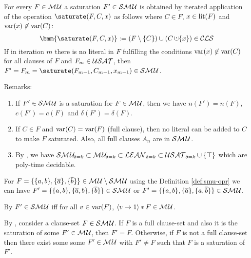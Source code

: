\documentclass{article}
\begin{document}
\begin{defi}\label{def:smu-opr}
\cite{KullmannZhao2012ConfluenceJ} For every $F \in \mathcal{M\hspace{0.8pt}U}$ a saturation $F' \in \mathcal{S}\mathcal{M\hspace{0.8pt}U}$ is obtained by iterated application of the operation $\saturate(F,C,x)$ as follows where $C \in F$, $x \in \operatorname{lit}(F)$ and $\operatorname{var}(x) \not \in \operatorname{var}(C)$:
  \begin{displaymath}
    \bmm{\saturate(F,C,x)} := (F \sm \set{C}) \cup (C \addcup \set{x}) \in \Cls
  \end{displaymath}
If in iteration $m$ there is no literal in $F$ fulfilling the conditions $\operatorname{var}(x) \not \in \operatorname{var}(C)$ for all clauses of $F$ and $F_m \in \mathcal{USAT}$, then $F' =F_m=\saturate(F_{m-1},C_{m-1},x_{m-1}) \in \Smusat$. 
\end{defi}
Remarks:
  \begin{enumerate}
  \item If $F' \in \mathcal{S}\mathcal{M\hspace{0.8pt}U}$ is a saturation for $F \in \mathcal{M\hspace{0.8pt}U}$, then we have $n(F')=n(F)$, $c(F')=c(F)$ and $\delta(F')=\delta(F)$.
  \item If $C \in F$ and $\operatorname{var}(C) = \operatorname{var}(F)$ (full clause), then no literal can be added to $C$ to make $F$ saturated. Also, all full clauses $A_n$ are in $\mathcal{S}\mathcal{M\hspace{0.8pt}U}$.
  \item By \cite{Ku99dK}, we have $ \mathcal{S}\mathcal{M\hspace{0.8pt}U}_{\!\delta=k} \subset \mathcal{M\hspace{0.8pt}U}_{\!\delta=k} \subset \mathcal{LEAN}_{\delta=k} \subset \mathcal{USAT}_{\delta=k} \cup \{ \top \} $ which are poly-time decidable.
  \end{enumerate} 
  
\begin{examp}\label{exp:smu-exp}
 For $F = \{ \{ a,b \},\{ \overline{a} \},\{ \overline{b} \} \} \in \mathcal{M\hspace{0.8pt}U} \setminus \mathcal{S}\mathcal{M\hspace{0.8pt}U}$ using the Definition \ref{def:smu-opr} we can have $F'=\{ \{ a,b \},\{ \overline{a},b \},\{ \overline{b} \} \} \in \mathcal{S}\mathcal{M\hspace{0.8pt}U}$ or $F'=\{ \{ a,b \},\{ \overline{a} \},\{ a,\overline{b} \} \} \in \mathcal{S}\mathcal{M\hspace{0.8pt}U}$.
\end{examp}

\begin{lem}\label{lem:smu-mu}
By \cite{KullmannZhao2010Extremal}  $F' \in \mathcal{S}\mathcal{M\hspace{0.8pt}U}$ iff for all $v \in \operatorname{var}(F)$, $\langle v \rightarrow 1 \rangle*F \in \mathcal{M\hspace{0.8pt}U}$.
\end{lem}

\begin{lem}\label{lem:smu-app}
By \cite{KullmannZhao2010Extremal}, consider a clause-set $F \in \mathcal{S}\mathcal{M\hspace{0.8pt}U}$. If $F$ is a full clause-set and also it is the saturation of some $F' \in \mathcal{M\hspace{0.8pt}U}$, then $F' = F$. Otherwise, if $F$ is not a full clause-set then there exist some some $F' \in \mathcal{M\hspace{0.8pt}U}$ with $F' \not= F$ such that $F$ is a saturation of $F'$.
\end{lem}
\end{document}
